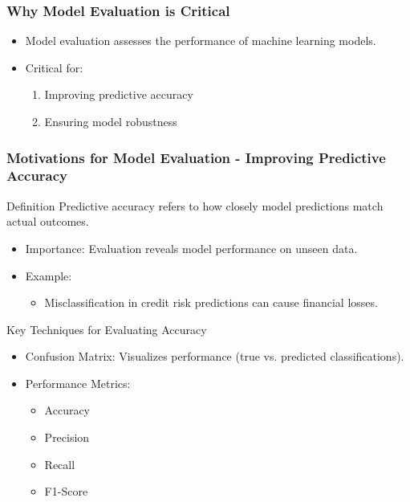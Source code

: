 \documentclass[aspectratio=169]{beamer}
\begin{document}
\begin{frame}[fragile]
    \frametitle{Why Model Evaluation is Critical}
    \begin{itemize}
        \item Model evaluation assesses the performance of machine learning models.
        \item Critical for:
        \begin{enumerate}
            \item Improving predictive accuracy
            \item Ensuring model robustness
        \end{enumerate}
    \end{itemize}
\end{frame}

\begin{frame}[fragile]
    \frametitle{Motivations for Model Evaluation - Improving Predictive Accuracy}
    
    \begin{block}{Definition}
        Predictive accuracy refers to how closely model predictions match actual outcomes.
    \end{block}
    
    \begin{itemize}
        \item Importance: Evaluation reveals model performance on unseen data.
        \item Example: 
        \begin{itemize}
            \item Misclassification in credit risk predictions can cause financial losses.
        \end{itemize}
    \end{itemize}

    \begin{block}{Key Techniques for Evaluating Accuracy}
        \begin{itemize}
            \item Confusion Matrix: Visualizes performance (true vs. predicted classifications).
            \item Performance Metrics: 
                \begin{itemize}
                    \item Accuracy
                    \item Precision
                    \item Recall
                    \item F1-Score
                \end{itemize}
        \end{itemize}
    \end{block}
    

\end{frame}
\end{document}
